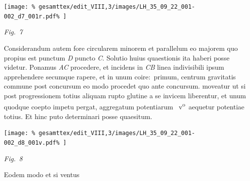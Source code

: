 \centerline{%
\texttt{[image: \%
gesamttex/edit\_VIII,3/images/LH\_35\_09\_22\_001-002\_d7\_001r.pdf\%
]}} 
\vspace{0.5em}
\centerline{%
\lbrack\textit{Fig.~7}\rbrack%
}
\vspace{1em}
%
\pstart
Considerandum autem fore circularem
%
%
minorem et parallelum%
\protect{}
%
 eo majorem quo propius est punctum \textit{D} puncto \textit{C}. Solutio huius quaestionis ita haberi posse videtur.
%
Ponamus \textit{AC} procedere, et incidens in \textit{CB} linea indivisibili%
\protect{}
%
ipsum apprehendere
%
%
secumque rapere, et in unum coire\lbrack:\rbrack\ primum, centrum gravitatis
%
%
commune%
\protect{}
%
post concursum eo modo procedet quo ante concursum.
%
%
moveatur 
%
ut si post progressionem totius aliquam
%
rupto glutine\protect{} a se invicem liberentur, et unum quodque coepto 
%
impetu\protect{} pergat, aggregatum potentiarum%
\protect{} 
%
~v\textsuperscript{o}\rbrack\ aequetur potentiae totius.%
\protect{}
\pend
%
\pstart
Et hinc puto determinari posse quaesitum.
\pend
%
\vspace{1.5em} %
\centerline{%
\texttt{[image: \%
gesamttex/edit\_VIII,3/images/LH\_35\_09\_22\_001-002\_d8\_001v.pdf\%
]}} 
\vspace{0.5em}
\centerline{%
\lbrack\textit{Fig.~8}\rbrack%
}
\vspace{1em}
%
\pstart
%
\hspace{1mm}\hspace{-1mm}%
%
Eodem modo et si ventus%
\protect{}
